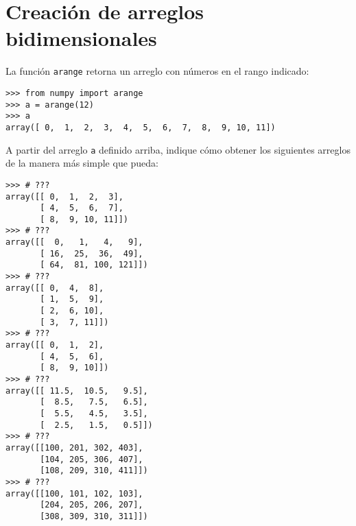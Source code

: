 \section{Creación de arreglos bidimensionales}

La función \lstinline!arange! retorna un arreglo con números en el rango
indicado:

\begin{lstlisting}
>>> from numpy import arange
>>> a = arange(12)
>>> a
array([ 0,  1,  2,  3,  4,  5,  6,  7,  8,  9, 10, 11])
\end{lstlisting}

A partir del arreglo \lstinline!a! definido arriba, indique cómo obtener
los siguientes arreglos de la manera más simple que pueda:

\begin{lstlisting}
>>> # ???
array([[ 0,  1,  2,  3],
       [ 4,  5,  6,  7],
       [ 8,  9, 10, 11]])
>>> # ???
array([[  0,   1,   4,   9],
       [ 16,  25,  36,  49],
       [ 64,  81, 100, 121]])
>>> # ???
array([[ 0,  4,  8],
       [ 1,  5,  9],
       [ 2,  6, 10],
       [ 3,  7, 11]])
>>> # ???
array([[ 0,  1,  2],
       [ 4,  5,  6],
       [ 8,  9, 10]])
>>> # ???
array([[ 11.5,  10.5,   9.5],
       [  8.5,   7.5,   6.5],
       [  5.5,   4.5,   3.5],
       [  2.5,   1.5,   0.5]])
>>> # ???
array([[100, 201, 302, 403],
       [104, 205, 306, 407],
       [108, 209, 310, 411]])
>>> # ???
array([[100, 101, 102, 103],
       [204, 205, 206, 207],
       [308, 309, 310, 311]])
\end{lstlisting}


